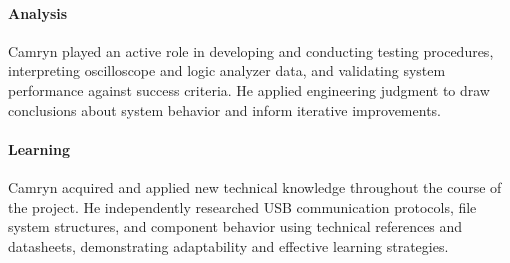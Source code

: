 \documentclass[../../main.tex]{subfiles}
\begin{document}
\paragraph{Analysis}
Camryn played an active role in developing and conducting testing procedures, interpreting oscilloscope and logic analyzer data, and validating system performance against success criteria. He applied engineering judgment to draw conclusions about system behavior and inform iterative improvements.

\paragraph{Learning}
Camryn acquired and applied new technical knowledge throughout the course of the project. He independently researched USB communication protocols, file system structures, and component behavior using technical references and datasheets, demonstrating adaptability and effective learning strategies.
\end{document}
